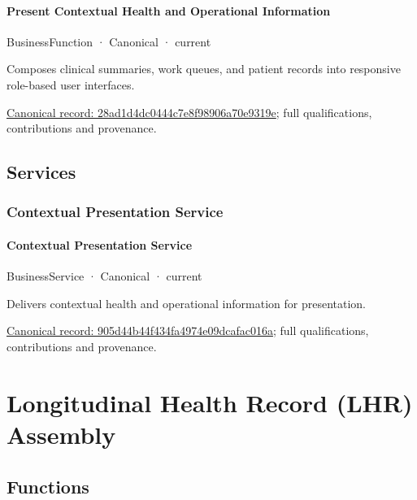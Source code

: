 \paragraph{Present Contextual Health and Operational Information}

\label{element:28ad1d4dc0444c7e8f98906a70e9319e}
{\small BusinessFunction · Canonical · current}\par

Composes clinical summaries, work queues, and patient records into responsive role-based user interfaces.


{\footnotesize \href{../../../../continuum/business/business-function/28ad1d4dc0444c7e8f98906a70e9319e.md}{Canonical record: 28ad1d4dc0444c7e8f98906a70e9319e}; full qualifications, contributions and provenance.}\par
\subsection{Services}

\subsubsection{Contextual Presentation Service}

\paragraph{Contextual Presentation Service}

\label{element:905d44b44f434fa4974e09dcafac016a}
{\small BusinessService · Canonical · current}\par

Delivers contextual health and operational information for presentation.


{\footnotesize \href{../../../../continuum/business/business-service/905d44b44f434fa4974e09dcafac016a.md}{Canonical record: 905d44b44f434fa4974e09dcafac016a}; full qualifications, contributions and provenance.}\par
\section{Longitudinal Health Record (LHR) Assembly}

\subsection{Functions}

